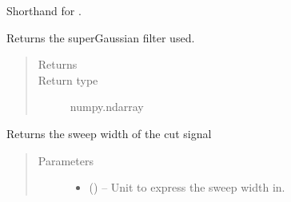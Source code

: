 \documentclass[letterpaper,10pt,english]{sphinxmanual}
\begin{document}
\begin{fulllineitems}
\begin{fulllineitems}
\label{\detokenize{references/freqfilter:nmrespy.freqfilter.FrequencyFilter.get_sg}}
\sphinxAtStartPar
Shorthand for {\hyperref[\detokenize{references/freqfilter:nmrespy.freqfilter.FrequencyFilter.get_super_gaussian}]{}}.

\end{fulllineitems}


\begin{fulllineitems}
\label{\detokenize{references/freqfilter:nmrespy.freqfilter.FrequencyFilter.get_super_gaussian}}
\sphinxAtStartPar
Returns the super\sphinxhyphen{}Gaussian filter used.
\begin{quote}\begin{description}
\item[{Returns}] \leavevmode
\sphinxAtStartPar
{}

\item[{Return type}] \leavevmode
\sphinxAtStartPar
numpy.ndarray

\end{description}\end{quote}

\end{fulllineitems}


\begin{fulllineitems}
\label{\detokenize{references/freqfilter:nmrespy.freqfilter.FrequencyFilter.get_sw}}
\sphinxAtStartPar
Returns the sweep width of the cut signal
\begin{quote}\begin{description}
\item[{Parameters}] \leavevmode\begin{itemize}
\item {} 
\sphinxAtStartPar
{} (\sphinxstyleliteralemphasis{\sphinxupquote{, }}\sphinxstyleliteralemphasis{\sphinxupquote{, }}) – Unit to express the sweep width in.


\end{itemize}
\end{description}
\end{quote}
\end{fulllineitems}
\end{fulllineitems}
\end{document}
